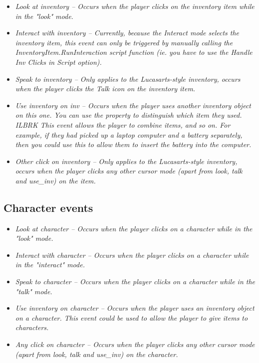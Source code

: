 \begin{itemize}
\item \it{Look at inventory} -- Occurs when the player clicks on the inventory item
while in the "look" mode.
\item \it{Interact with inventory} -- Currently, because the Interact mode selects the
inventory item, this event can only be triggered by manually calling
the InventoryItem.RunInteraction script function (ie. you have to use the Handle
Inv Clicks in Script option).
\item \it{Speak to inventory} -- Only applies to the Lucasarts-style inventory,
occurs when the player clicks the Talk icon on the inventory item.
\item \it{Use inventory on inv} -- Occurs when the player uses another inventory
object on this one. You can use the 
property to distinguish which item they used. ILBRK
This event allows the player to combine items, and so on. For example, if they had
picked up a laptop computer and a battery separately, then you could use this to
allow them to insert the battery into the computer.
\item \it{Other click on inventory} -- Only applies to the Lucasarts-style inventory,
occurs when the player clicks any other cursor mode (apart from look, talk
and use_inv) on the item.
\end{itemize}

\subsection{Character events}%

\begin{itemize}
\item \it{Look at character} -- Occurs when the player clicks on a character while in the "look" mode.
\item \it{Interact with character} -- Occurs when the player clicks on a character while in the "interact" mode.
\item \it{Speak to character} -- Occurs when the player clicks on a character while in the "talk" mode.
\item \it{Use inventory on character} -- Occurs when the player uses an inventory
object on a character.  This event could be used to allow the player to give items to characters.
\item \it{Any click on character} -- Occurs when the player clicks any other cursor mode
(apart from look, talk and use_inv) on the character.
\end{itemize}

